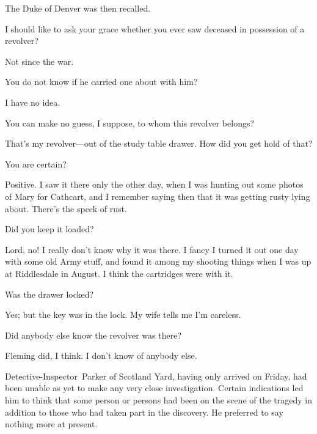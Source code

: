 The Duke of Denver was then recalled.
\begin{dialogue}

 I should like to ask your grace whether you ever saw deceased in possession of a revolver?

 Not since the war.

 You do not know if he carried one about with him?

 I have no idea.

 You can make no guess, I suppose, to whom this revolver belongs?

  That's my revolver—out of the study table drawer. How did you get hold of that? 

 You are certain?

 Positive. I saw it there only the other day, when I was hunting out some photos of Mary for Cathcart, and I remember saying then that it was getting rusty lying about. There's the speck of rust.

 Did you keep it loaded?

 Lord, no! I really don't know why it was there. I fancy I turned it out one day with some old Army stuff, and found it among my shooting things when I was up at Riddlesdale in August. I think the cartridges were with it.

 Was the drawer locked?

 Yes; but the key was in the lock. My wife tells me I'm careless.

 Did anybody else know the revolver was there?

 Fleming did, I think. I don't know of anybody else.
\end{dialogue}

Detective-Inspector~Parker of Scotland Yard, having only arrived on Friday, had been unable as yet to make any very close investigation.  Certain indications led him to think that some person or persons had been on the scene of the tragedy in addition to those who had taken part in the discovery. He preferred to say nothing more at present.

